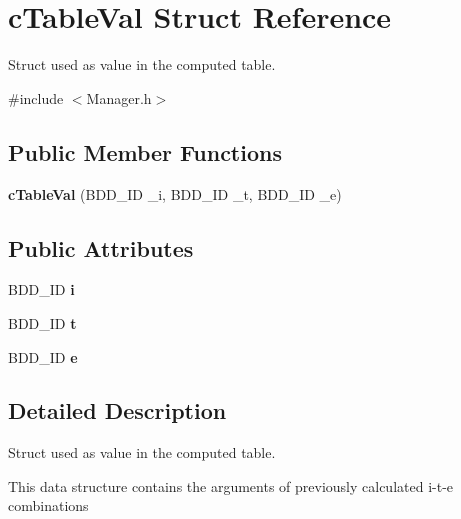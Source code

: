 \hypertarget{structcTableVal}{}\section{c\+Table\+Val Struct Reference}
\label{structcTableVal}


Struct used as value in the computed table.  




{\ttfamily \#include $<$Manager.\+h$>$}

\subsection*{Public Member Functions}
\begin{DoxyCompactItemize}
\item 
\mbox{\label{structcTableVal_a22fc4897c20dbe73c37a8e1923f9ca7c}} 
{\bfseries c\+Table\+Val} (B\+D\+D\+\_\+\+ID \+\_\+i, B\+D\+D\+\_\+\+ID \+\_\+t, B\+D\+D\+\_\+\+ID \+\_\+e)
\end{DoxyCompactItemize}
\subsection*{Public Attributes}
\begin{DoxyCompactItemize}
\item 
\mbox{\label{structcTableVal_a3600ed12ce2bb26e93ce5c2e00a98d3a}} 
B\+D\+D\+\_\+\+ID {\bfseries i}
\item 
\mbox{\label{structcTableVal_a6310500b8caae666044f1a8aac20af3a}} 
B\+D\+D\+\_\+\+ID {\bfseries t}
\item 
\mbox{\label{structcTableVal_aa68a08fe21dd1acb23eb0ac3be8b5d15}} 
B\+D\+D\+\_\+\+ID {\bfseries e}
\end{DoxyCompactItemize}


\subsection{Detailed Description}
Struct used as value in the computed table. 

This data structure contains the arguments of previously calculated i-\/t-\/e combinations 